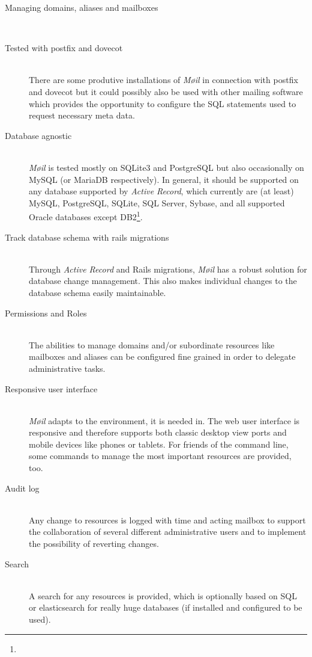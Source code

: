\documentclass[12pt,a4paper]{scrartcl}
\begin{document}
			\begin{description}
				\item[\rm Managing domains, aliases and mailboxes]\ \\
					\todo

				\item[\rm Tested with postfix and dovecot]\ \\
					There are some produtive installations of \emph{Møil} in
					connection with postfix and dovecot but it could possibly
					also be used with other mailing software which provides the
					opportunity to configure the \ac{SQL} statements used to
					request necessary meta data.
				
				\item[\rm Database agnostic]\ \\
					\emph{Møil} is tested mostly on SQLite3 and PostgreSQL but
					also occasionally on MySQL (or MariaDB respectively). In
					general, it should be supported on any database supported
					by \emph{Active Record}, which currently are (at least)
					MySQL, PostgreSQL, SQLite, SQL Server, Sybase, and all
					supported Oracle databases except
					DB2\footnote{\urlARSupport}.

				\item[\rm Track database schema with rails migrations]\ \\
					Through \emph{Active Record} and \ac{Rails} migrations,
					\emph{Møil} has a robust solution for database change
					management. This also makes individual changes to the
					database schema easily maintainable.

				\item[\rm Permissions and Roles]\ \\
					The abilities to manage domains and/or subordinate resources
					like mailboxes and aliases can be configured fine grained
					in order to delegate administrative tasks.

				\item[\rm Responsive user interface]\ \\
					\emph{Møil} adapts to the environment, it is needed in. The
					web user interface is responsive and therefore supports
					both classic desktop view ports and mobile devices like
					phones or tablets. For friends of the command line, some
					commands to manage the most important resources are
					provided, too.

				\item[\rm Audit log]\ \\
					Any change to resources is logged with time and acting
					mailbox to support the collaboration of several different
					administrative users and to implement the possibility of
					reverting changes.

				\item[\rm Search]\ \\
					A search for any resources is provided, which is optionally
					based on \ac{SQL} or elasticsearch for really huge
					databases (if installed and configured to be used).
			\end{description}
\end{document}
